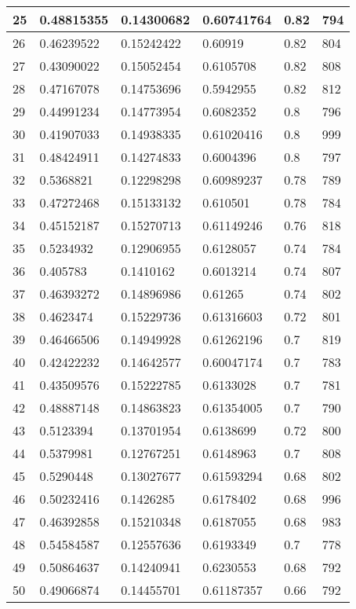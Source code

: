 \begin{longtable}{|l|l|l|l|l|l|}
25 & 0.48815355 & 0.14300682 & 0.60741764 & 0.82 & 794 \\ \hline 
26 & 0.46239522 & 0.15242422 & 0.60919 & 0.82 & 804 \\ \hline 
27 & 0.43090022 & 0.15052454 & 0.6105708 & 0.82 & 808 \\ \hline 
28 & 0.47167078 & 0.14753696 & 0.5942955 & 0.82 & 812 \\ \hline 
29 & 0.44991234 & 0.14773954 & 0.6082352 & 0.8 & 796 \\ \hline 
30 & 0.41907033 & 0.14938335 & 0.61020416 & 0.8 & 999 \\ \hline 
31 & 0.48424911 & 0.14274833 & 0.6004396 & 0.8 & 797 \\ \hline 
32 & 0.5368821 & 0.12298298 & 0.60989237 & 0.78 & 789 \\ \hline 
33 & 0.47272468 & 0.15133132 & 0.610501 & 0.78 & 784 \\ \hline 
34 & 0.45152187 & 0.15270713 & 0.61149246 & 0.76 & 818 \\ \hline 
35 & 0.5234932 & 0.12906955 & 0.6128057 & 0.74 & 784 \\ \hline 
36 & 0.405783 & 0.1410162 & 0.6013214 & 0.74 & 807 \\ \hline 
37 & 0.46393272 & 0.14896986 & 0.61265 & 0.74 & 802 \\ \hline 
38 & 0.4623474 & 0.15229736 & 0.61316603 & 0.72 & 801 \\ \hline 
39 & 0.46466506 & 0.14949928 & 0.61262196 & 0.7 & 819 \\ \hline 
40 & 0.42422232 & 0.14642577 & 0.60047174 & 0.7 & 783 \\ \hline 
41 & 0.43509576 & 0.15222785 & 0.6133028 & 0.7 & 781 \\ \hline 
42 & 0.48887148 & 0.14863823 & 0.61354005 & 0.7 & 790 \\ \hline 
43 & 0.5123394 & 0.13701954 & 0.6138699 & 0.72 & 800 \\ \hline 
44 & 0.5379981 & 0.12767251 & 0.6148963 & 0.7 & 808 \\ \hline 
45 & 0.5290448 & 0.13027677 & 0.61593294 & 0.68 & 802 \\ \hline 
46 & 0.50232416 & 0.1426285 & 0.6178402 & 0.68 & 996 \\ \hline 
47 & 0.46392858 & 0.15210348 & 0.6187055 & 0.68 & 983 \\ \hline 
48 & 0.54584587 & 0.12557636 & 0.6193349 & 0.7 & 778 \\ \hline 
49 & 0.50864637 & 0.14240941 & 0.6230553 & 0.68 & 792 \\ \hline 
50 & 0.49066874 & 0.14455701 & 0.61187357 & 0.66 & 792 \\ \hline 
\end{longtable}